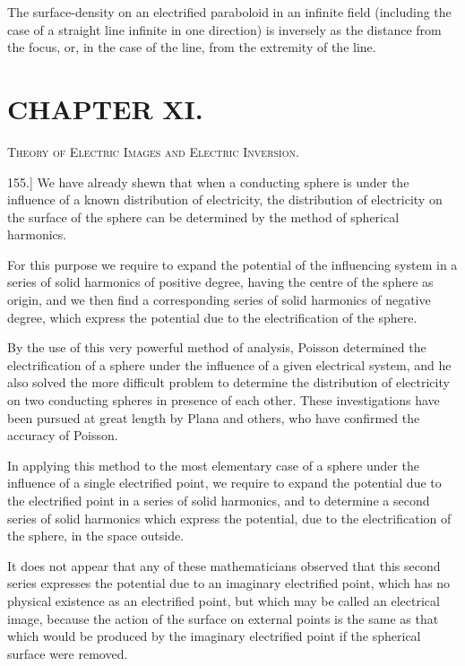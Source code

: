 \documentclass[11pt,a4paper]{article}
\begin{document}
The surface-density on an electrified paraboloid in an infinite field (including the case of a straight line infinite in one direction) is inversely as the distance from the focus, or, in the case of the line, from the extremity of the line.

\section*{CHAPTER XI.}

{\centering\scshape Theory of Electric Images and Electric Inversion.\par}

155.] We have already shewn that when a conducting sphere is under the influence of a known distribution of electricity, the distribution of electricity on the surface of the sphere can be determined by the method of spherical harmonics.

For this purpose we require to expand the potential of the influencing system in a series of solid harmonics of positive degree, having the centre of the sphere as origin, and we then find a corresponding series of solid harmonics of negative degree, which express the potential due to the electrification of the sphere.

By the use of this very powerful method of analysis, Poisson determined the electrification of a sphere under the influence of a given electrical system, and he also solved the more difficult problem to determine the distribution of electricity on two conducting spheres in presence of each other. These investigations have been pursued at great length by Plana and others, who have confirmed the accuracy of Poisson.

In applying this method to the most elementary case of a sphere under the influence of a single electrified point, we require to expand the potential due to the electrified point in a series of solid harmonics, and to determine a second series of solid harmonics which express the potential, due to the electrification of the sphere, in the space outside.

It does not appear that any of these mathematicians observed that this second series expresses the potential due to an imaginary electrified point, which has no physical existence as an electrified point, but which may be called an electrical image, because the action of the surface on external points is the same as that which would be produced by the imaginary electrified point if the spherical surface were removed.
\end{document}
